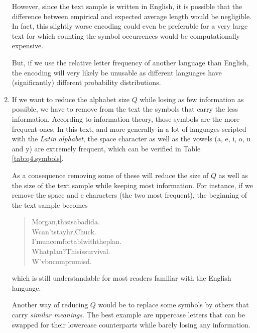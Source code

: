 \documentclass[a4paper, 12pt]{article}
\begin{document}
\begin{enumerate}[leftmargin=*]
        However, since the text sample is written in English, it is possible that the difference between empirical and expected average length would be negligible. In fact, this slightly worse encoding could even be preferable for a very large text for which counting the symbol occurrences would be computationally expensive.
        
        But, if we use the relative letter frequency of another language than English, the encoding will very likely be unusable as different languages have (significantly) different probability distributions.
        
        
        \item If we want to reduce the alphabet size $Q$ while losing as few information as possible, we have to remove from the text the symbols that carry the less information. According to information theory, those symbols are the more frequent ones. In this text, and more generally in a lot of languages scripted with the \emph{Latin alphabet}, the space character as well as the vowels (a, e, i, o, u and y) are extremely frequent, which can be verified in Table \ref{tab:q4.symbols}.
        
        As a consequence removing some of these will reduce the size of $Q$ as well as the size of the text sample while keeping most information. For instance, if we remove the space and \og{}e\fg{} characters (the two most frequent), the beginning of the text sample becomes
        
        \begin{quote}
            \centering
            Morgan,thisisabadida. \\
            Wcan'tstayhr,Chuck. \\
            I'muncomfortablwiththeplan. \\
            Whatplan?Thisissurvival. \\
            W'vbncompromisd.
        \end{quote}
        
        which is still understandable for most readers familiar with the English language.
        
        Another way of reducing $Q$ would be to replace some symbols by others that carry \emph{similar meanings}. The best example are uppercase letters that can be swapped for their lowercase counterparts while barely losing any information.
        
        

\end{enumerate}
\end{document}
